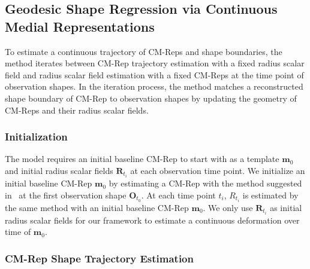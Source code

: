 \documentclass{llncs}
\begin{document}
\subsection{Geodesic Shape Regression via Continuous Medial Representations}
\label{ssec:Regression}

To estimate a continuous trajectory of CM-Reps and shape boundaries, the method iterates between CM-Rep trajectory estimation with a fixed radius scalar field and radius scalar field estimation with a fixed CM-Reps at the time point of observation shapes. In the iteration process, the method matches a reconstructed shape boundary of CM-Rep to observation shapes by updating the geometry of CM-Reps and their radius scalar fields.

\subsubsection{Initialization}
The model requires an initial baseline CM-Rep to start with as a template $\mathbf{m}_0$ and initial radius scalar fields $\mathbf{R}_{t_i}$ at each observation time point. 
We initialize an initial baseline CM-Rep $\mathbf{m}_0$ by estimating a CM-Rep with the method suggested in~\cite{Yushkevich2009} at the first observation shape $\mathbf{O}_{t_0}$.
At each time point $t_i$, $R_{t_i}$ is estimated by the same method with an initial baseline CM-Rep $\mathbf{m}_0$. We only use $\mathbf{R}_{t_i}$ as initial radius scalar fields for our framework to estimate a continuous deformation over time of $\mathbf{m}_0$.

\subsubsection{CM-Rep Shape Trajectory Estimation}
\label{sssec:GeoUpdate}
\end{document}
